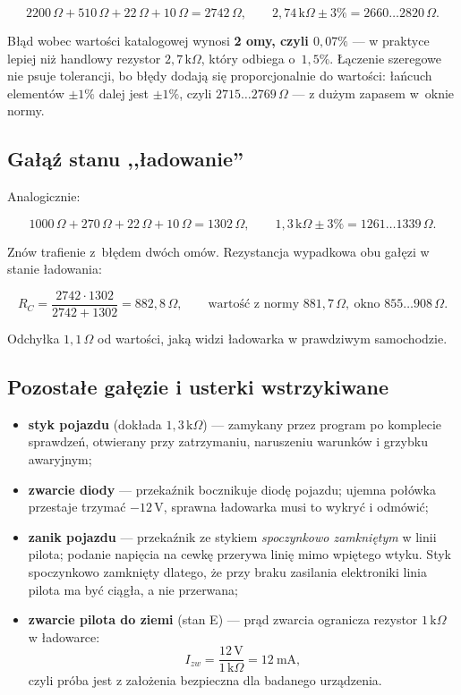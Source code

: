 \documentclass[a4paper,11pt]{article}
\newcommand{\ohm}{\,\Omega}
\newcommand{\kohm}{\,\mathrm{k}\Omega}
\newcommand{\volt}{\,\mathrm{V}}
\begin{document}
\[
2200\ohm+510\ohm+22\ohm+10\ohm=2742\ohm ,
\qquad
2{,}74\kohm\pm3\%=2660\ldots2820\ohm .
\]

Błąd wobec wartości katalogowej wynosi \textbf{2 omy, czyli $0{,}07\%$} --- w praktyce
lepiej niż handlowy rezystor $2{,}7\kohm$, który odbiega o~$1{,}5\%$. Łączenie szeregowe
nie psuje tolerancji, bo błędy dodają się proporcjonalnie do wartości: łańcuch
elementów $\pm1\%$ dalej jest $\pm1\%$, czyli $2715\ldots2769\ohm$ --- z dużym zapasem
w~oknie normy.

\subsection{Gałąź stanu ,,ładowanie''}

Analogicznie:

\[
1000\ohm+270\ohm+22\ohm+10\ohm=1302\ohm ,
\qquad
1{,}3\kohm\pm3\%=1261\ldots1339\ohm .
\]

Znów trafienie z~błędem dwóch omów. Rezystancja wypadkowa obu gałęzi w stanie
ładowania:

\[
R_C=\frac{2742\cdot1302}{2742+1302}=882{,}8\ohm ,
\qquad
\text{wartość z normy } 881{,}7\ohm,\ \text{okno } 855\ldots908\ohm .
\]

Odchyłka $1{,}1\ohm$ od wartości, jaką widzi ładowarka w prawdziwym samochodzie.

\subsection{Pozostałe gałęzie i usterki wstrzykiwane}

\begin{itemize}
\item \textbf{styk pojazdu} (dokłada $1{,}3\kohm$) --- zamykany przez program po
      komplecie sprawdzeń, otwierany przy zatrzymaniu, naruszeniu warunków
      i grzybku awaryjnym;
\item \textbf{zwarcie diody} --- przekaźnik bocznikuje diodę pojazdu; ujemna połówka
      przestaje trzymać $-12\volt$, sprawna ładowarka musi to wykryć i odmówić;
\item \textbf{zanik pojazdu} --- przekaźnik ze stykiem \emph{spoczynkowo zamkniętym}
      w linii pilota; podanie napięcia na cewkę przerywa linię mimo wpiętego wtyku.
      Styk spoczynkowo zamknięty dlatego, że przy braku zasilania elektroniki linia
      pilota ma być ciągła, a nie przerwana;
\item \textbf{zwarcie pilota do ziemi} (stan E) --- prąd zwarcia ogranicza rezystor
      $1\kohm$ w ładowarce:
      \[
      I_{zw}=\frac{12\volt}{1\kohm}=12\ \mathrm{mA},
      \]
      czyli próba jest z założenia bezpieczna dla badanego urządzenia.
\end{itemize}
\end{document}
